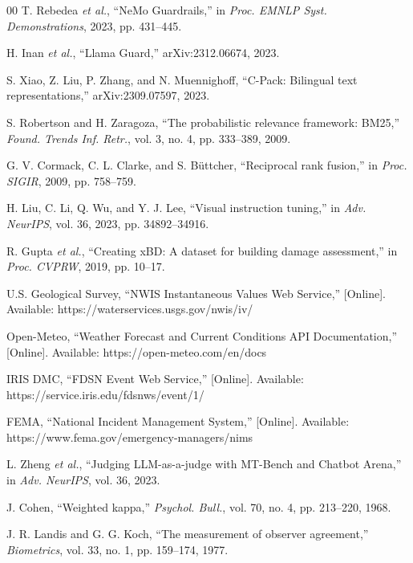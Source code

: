 \documentclass[conference]{IEEEtran}
\begin{document}
\begin{thebibliography}{00}
 T. Rebedea \textit{et al.}, ``NeMo Guardrails,'' in \textit{Proc. EMNLP Syst. Demonstrations}, 2023, pp. 431--445.

 H. Inan \textit{et al.}, ``Llama Guard,'' arXiv:2312.06674, 2023.

 S. Xiao, Z. Liu, P. Zhang, and N. Muennighoff, ``C-Pack: Bilingual text representations,'' arXiv:2309.07597, 2023.

 S. Robertson and H. Zaragoza, ``The probabilistic relevance framework: BM25,'' \textit{Found. Trends Inf. Retr.}, vol. 3, no. 4, pp. 333--389, 2009.

 G. V. Cormack, C. L. Clarke, and S. B\"{u}ttcher, ``Reciprocal rank fusion,'' in \textit{Proc. SIGIR}, 2009, pp. 758--759.

 H. Liu, C. Li, Q. Wu, and Y. J. Lee, ``Visual instruction tuning,'' in \textit{Adv. NeurIPS}, vol. 36, 2023, pp. 34892--34916.

 R. Gupta \textit{et al.}, ``Creating xBD: A dataset for building damage assessment,'' in \textit{Proc. CVPRW}, 2019, pp. 10--17.

 U.S. Geological Survey, ``NWIS Instantaneous Values Web Service,'' [Online]. Available: https://waterservices.usgs.gov/nwis/iv/



 Open-Meteo, ``Weather Forecast and Current Conditions API Documentation,'' [Online]. Available: https://open-meteo.com/en/docs



 IRIS DMC, ``FDSN Event Web Service,'' [Online]. Available: https://service.iris.edu/fdsnws/event/1/



 FEMA, ``National Incident Management System,'' [Online]. Available: https://www.fema.gov/emergency-managers/nims



 L. Zheng \textit{et al.}, ``Judging LLM-as-a-judge with MT-Bench and Chatbot Arena,'' in \textit{Adv. NeurIPS}, vol. 36, 2023.



 J. Cohen, ``Weighted kappa,'' \textit{Psychol. Bull.}, vol. 70, no. 4, pp. 213--220, 1968.



 J. R. Landis and G. G. Koch, ``The measurement of observer agreement,'' \textit{Biometrics}, vol. 33, no. 1, pp. 159--174, 1977.\end{thebibliography}
\end{document}
